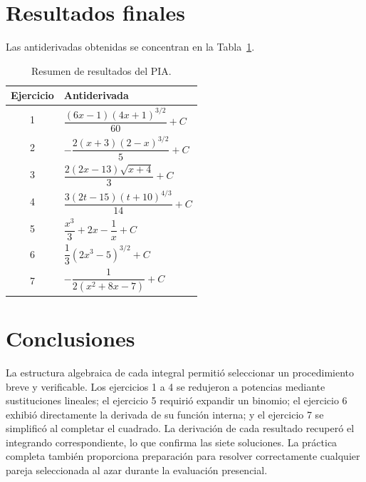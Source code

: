 \section{Resultados finales}
Las antiderivadas obtenidas se concentran en la Tabla~\ref{tab:resultados-pia}.
\begin{table}[H]
\centering
\caption{Resumen de resultados del PIA.}
\label{tab:resultados-pia}
\small
\begin{tabular}{cl}
\toprule
Ejercicio & Antiderivada \\
\midrule
1 & $\dfrac{(6x-1)(4x+1)^{3/2}}{60}+C$ \\[2mm]
2 & $-\dfrac{2(x+3)(2-x)^{3/2}}5+C$ \\[2mm]
3 & $\dfrac{2(2x-13)\sqrt{x+4}}3+C$ \\[2mm]
4 & $\dfrac{3(2t-15)(t+10)^{4/3}}{14}+C$ \\[2mm]
5 & $\dfrac{x^3}{3}+2x-\dfrac1x+C$ \\[2mm]
6 & $\dfrac13(2x^3-5)^{3/2}+C$ \\[2mm]
7 & $-\dfrac1{2(x^2+8x-7)}+C$ \\
\bottomrule
\end{tabular}
\end{table}

\section{Conclusiones}
La estructura algebraica de cada integral permitió seleccionar un procedimiento breve y verificable. Los ejercicios 1 a 4 se redujeron a potencias mediante sustituciones lineales; el ejercicio 5 requirió expandir un binomio; el ejercicio 6 exhibió directamente la derivada de su función interna; y el ejercicio 7 se simplificó al completar el cuadrado. La derivación de cada resultado recuperó el integrando correspondiente, lo que confirma las siete soluciones. La práctica completa también proporciona preparación para resolver correctamente cualquier pareja seleccionada al azar durante la evaluación presencial.

\nocite{openstax2016calculus1,openstax2016calculus2}

